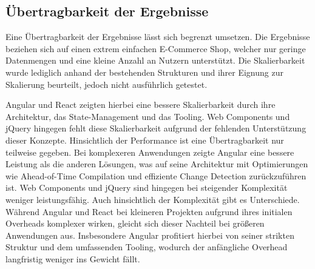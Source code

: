 \documentclass[oneside]{ausarbeitung}
\begin{document}
\subsection{Übertragbarkeit der Ergebnisse}
\label{sub:uebertragbarkeit}

Eine Übertragbarkeit der Ergebnisse lässt sich begrenzt umsetzen. Die Ergebnisse beziehen sich auf einen extrem einfachen E-Commerce Shop, welcher nur geringe Datenmengen und eine kleine Anzahl an Nutzern unterstützt. Die Skalierbarkeit wurde lediglich anhand der bestehenden Strukturen und ihrer Eignung zur Skalierung beurteilt, jedoch nicht ausführlich getestet.

Angular und React zeigten hierbei eine bessere Skalierbarkeit durch ihre Architektur, das State-Management und das Tooling. Web Components und jQuery hingegen fehlt diese Skalierbarkeit aufgrund der fehlenden Unterstützung dieser Konzepte. Hinsichtlich der Performance ist eine Übertragbarkeit nur teilweise gegeben. Bei komplexeren Anwendungen zeigte Angular eine bessere Leistung als die anderen Lösungen, was auf seine Architektur mit Optimierungen wie Ahead-of-Time Compilation und effiziente Change Detection zurückzuführen ist. Web Components und jQuery sind hingegen bei steigender Komplexität weniger leistungsfähig. 
Auch hinsichtlich der Komplexität gibt es Unterschiede. Während Angular und React bei kleineren Projekten aufgrund ihres initialen Overheads komplexer wirken, gleicht sich dieser Nachteil bei größeren Anwendungen aus. Insbesondere Angular profitiert hierbei von seiner strikten Struktur und dem umfassenden Tooling, wodurch der anfängliche Overhead langfristig weniger ins Gewicht fällt.

\appendix

\printbibliography



\end{document}
